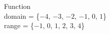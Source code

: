 {\noindent\begin{minipage}{\linewidth}\centering
{}
\end{minipage}}
{Function \\ domain = \{$-4$, $-3$, $-2$, $-1$, $0$, $1$\} \\ range = \{$-1$, $0$, $1$, $2$, $3$, $4$\}}